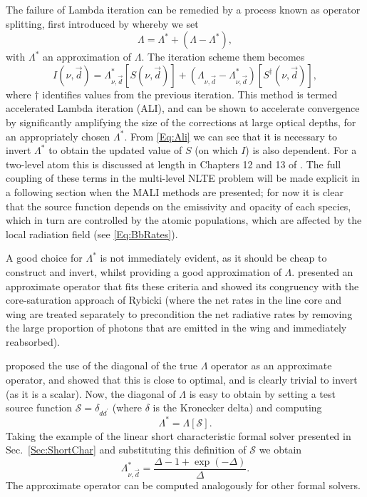 The failure of Lambda iteration can be remedied by a process known as operator splitting, first introduced by \citet{Cannon1973} whereby we set
\begin{equation}
    \Lambda = \Lambda^* + (\Lambda - \Lambda^*),
\end{equation}
with $\Lambda^*$ an approximation of $\Lambda$. The iteration scheme them becomes
\begin{equation}
    I(\nu, \vec{d}) = \Lambda_{\nu, \vec{d}}^*[S(\nu, \vec{d})] + (\Lambda_{\nu, \vec{d}} - \Lambda_{\nu, \vec{d}}^*)[S^{\dagger}(\nu, \vec{d})],
    \label{Eq:Ali}
\end{equation}
where $\dagger$ identifies values from the previous iteration. This method is termed accelerated Lambda iteration (ALI), and can be shown to accelerate convergence by significantly amplifying the size of the corrections at large optical depths, for an appropriately chosen $\Lambda^*$.
From \eqref{Eq:Ali} we can see that it is necessary to invert $\Lambda^*$ to obtain the updated value of $S$ (on which $I$) is also dependent. For a two-level atom this is discussed at length in Chapters 12 and 13 of \citet{Hubeny2014}.
The full coupling of these terms in the multi-level NLTE problem will be made explicit in a following section when the MALI methods are presented; for now it is clear that the source function depends on the emissivity and opacity of each species, which in turn are controlled by the atomic populations, which are affected by the local radiation field (see \eqref{Eq:BbRates}).

A good choice for $\Lambda^*$ is not immediately evident, as it should be cheap to construct and invert, whilst providing a good approximation of $\Lambda$. \citet{Scharmer1981} presented an approximate operator that fits these criteria and showed its congruency with the core-saturation approach of Rybicki \NeedRef{} (where the net rates in the line core and wing are treated separately to precondition the net radiative rates by removing the large proportion of photons that are emitted in the wing and immediately reabsorbed).

\citet{Olson1986} proposed the use of the diagonal of the true $\Lambda$ operator as an approximate operator, and showed that this is close to optimal, and is clearly trivial to invert (as it is a scalar). Now, the diagonal of $\Lambda$ is easy to obtain by setting a test source function $\mathcal{S}=\delta_{dd^\prime}$ (where $\delta$ is the Kronecker delta) and computing
\begin{equation}
    \Lambda^* = \Lambda[\mathcal{S}].
\end{equation}
Taking the example of the linear short characteristic formal solver presented in Sec.~\ref{Sec:ShortChar} and substituting this definition of $\mathcal{S}$ we obtain
\begin{equation}
    \Lambda^*_{\nu, \vec{d}} = \frac{\Delta - 1 + \exp(-\Delta)}{\Delta}.
\end{equation}
The approximate operator can be computed analogously for other formal solvers.

